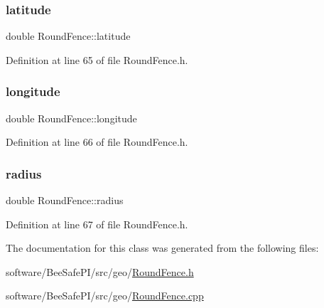 \subsubsection{\texorpdfstring{latitude}{latitude}}
{\footnotesize\ttfamily double Round\+Fence\+::latitude\hspace{0.3cm}{\ttfamily [private]}}



Definition at line 65 of file Round\+Fence.\+h.

\mbox{\label{class_round_fence_a122cccc61f294c1fcdf7ebe944944fca}} 
\subsubsection{\texorpdfstring{longitude}{longitude}}
{\footnotesize\ttfamily double Round\+Fence\+::longitude\hspace{0.3cm}{\ttfamily [private]}}



Definition at line 66 of file Round\+Fence.\+h.

\mbox{\label{class_round_fence_a8e9d1a2f22df0bb718522f3ab6cd3b83}} 
\subsubsection{\texorpdfstring{radius}{radius}}
{\footnotesize\ttfamily double Round\+Fence\+::radius\hspace{0.3cm}{\ttfamily [private]}}



Definition at line 67 of file Round\+Fence.\+h.



The documentation for this class was generated from the following files\+:\begin{DoxyCompactItemize}
\item 
software/\+Bee\+Safe\+P\+I/src/geo/\hyperlink{_round_fence_8h}{Round\+Fence.\+h}\item 
software/\+Bee\+Safe\+P\+I/src/geo/\hyperlink{_round_fence_8cpp}{Round\+Fence.\+cpp}\end{DoxyCompactItemize}
